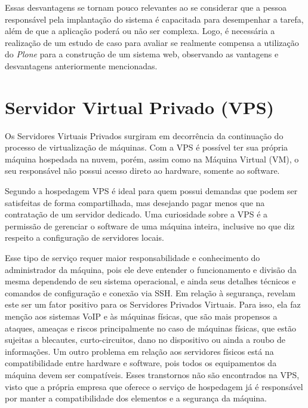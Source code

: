 Essas desvantagens se tornam pouco relevantes ao se considerar que a pessoa responsável pela implantação do sistema é capacitada para desempenhar a tarefa, além de que a aplicação poderá ou não ser complexa. Logo, é necessária a realização de um estudo de caso para avaliar se realmente compensa a utilização do \textit{Plone} para a construção de um sistema web, observando as vantagens e desvantagens anteriormente mencionadas. 

\hspace{2.5cm}

\section{Servidor Virtual Privado (VPS)}
\label{sec:vps}

\hspace{2.5cm}

Os Servidores Virtuais Privados surgiram em decorrência da continuação do processo de virtualização de máquinas. Com a VPS é possível ter sua própria máquina hospedada na nuvem, porém, assim como na Máquina Virtual (VM), o seu responsável não possui acesso direto ao hardware, somente ao software.

Segundo  a hospedagem VPS é ideal para quem possui demandas que podem ser satisfeitas de forma compartilhada, mas desejando pagar menos que na contratação de um servidor dedicado. Uma curiosidade sobre a VPS é a permissão de gerenciar o software de uma máquina inteira, inclusive no que diz respeito a configuração de servidores locais. 

Esse tipo de serviço requer maior responsabilidade e conhecimento do administrador da máquina, pois ele deve entender o funcionamento e divisão da mesma dependendo de seu sistema operacional, e ainda seus detalhes técnicos e comandos de configuração e conexão via SSH. Em relação à segurança,  revelam este ser um fator positivo para os Servidores Privados Virtuais. Para isso, ela faz menção aos sistemas VoIP e às máquinas físicas, que são mais propensos a ataques, ameaças e riscos principalmente no caso de máquinas físicas, que estão sujeitas a blecautes, curto-circuitos, dano no dispositivo ou ainda a roubo de informações. Um outro problema em relação aos servidores físicos está na compatibilidade entre hardware e software, pois todos os equipamentos da máquina devem ser compatíveis. Esses transtornos não são encontrados na VPS, visto que a própria empresa que oferece o serviço de hospedagem já é responsável por manter a compatibilidade dos elementos e a segurança da máquina.  



